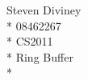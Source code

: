 \documentclass[a4paper,12pt]{article}
\begin{document}
\begin{center}
{\large Steven Diviney} \\*
08462267 \\*
CS2011 \\*
Ring Buffer \\*

\end{center}
\end{document}
